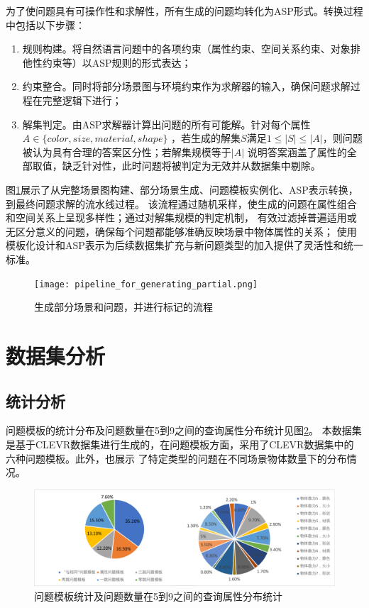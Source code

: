 为了使问题具有可操作性和求解性，所有生成的问题均转化为ASP形式。转换过程中包括以下步骤：
\begin{enumerate}
\item 规则构建。将自然语言问题中的各项约束（属性约束、空间关系约束、对象排他性约束等）以ASP规则的形式表达；
\item 约束整合。同时将部分场景图与环境约束作为求解器的输入，确保问题求解过程在完整逻辑下进行；
\item 解集判定。由ASP求解器计算出问题的所有可能解。针对每个属性$A \in \{ color, size, material, shape\}$
，若生成的解集$S$满足$1 \leq |S| \leq |A|$，则问题被认为具有合理的答案区分性；若解集规模等于$|A|$
说明答案涵盖了属性的全部取值，缺乏针对性，此时问题将被判定为无效并从数据集中剔除。
\end{enumerate}

图\ref{pipeline_for_generating_partial}展示了从完整场景图构建、部分场景生成、问题模板实例化、ASP表示转换，到最终问题求解的流水线过程。
该流程通过随机采样，使生成的问题在属性组合和空间关系上呈现多样性；通过对解集规模的判定机制，
有效过滤掉普遍适用或无区分意义的问题，确保每个问题都能够准确反映场景中物体属性的关系；
使用模板化设计和ASP表示为后续数据集扩充与新问题类型的加入提供了灵活性和统一标准。
\begin{figure}
    \centering
    \texttt{[image: pipeline\_for\_generating\_partial.png]}
    \caption{生成部分场景和问题，并进行标记的流程}
    \label{pipeline_for_generating_partial}
\end{figure}
\section{数据集分析}
\subsection{统计分析}
问题模板的统计分布及问题数量在5到9之间的查询属性分布统计见图\ref{fig:template_statistics}。
本数据集是基于CLEVR数据集进行生成的，在问题模板方面，采用了CLEVR数据集中的六种问题模板。此外，也展示
了特定类型的问题在不同场景物体数量下的分布情况。
\begin{figure}
    \includegraphics[width=\textwidth]{figures/template_combined-crop.pdf}
    \caption{问题模板统计及问题数量在5到9之间的查询属性分布统计}
    \label{fig:template_statistics}
\end{figure}

